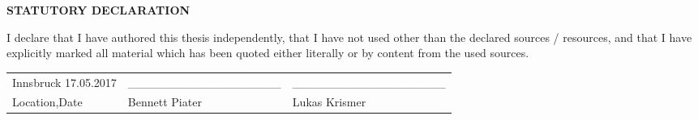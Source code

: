  \vspace*{\fill}
\thispagestyle{empty}
  \begin{center} \textbf{\large{STATUTORY DECLARATION}} \end{center}
  I declare that I have authored this thesis independently, that I have not used other than the declared sources  /  resources,  and  that  I  have  explicitly  marked  all  material  which  has  been  quoted  either literally or by content from the used sources.

  \begin{center}
  \begin{table}[!htb]
  \begin{tabularx}{\textwidth}{lXX}
  Innsbruck 17.05.2017 & \_\_\_\_\_\_\_\_\_\_\_\_\_\_\_\_\_\_ & \_\_\_\_\_\_\_\_\_\_\_\_\_\_\_\_\_\_ \\
  Location,Date & Bennett Piater & Lukas Krismer \\

  \end{tabularx}
  \end{table}
  \end{center}
  \vspace*{\fill}
  \pagebreak 
